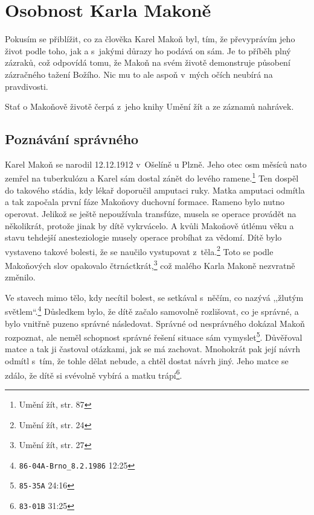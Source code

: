 \chapter{Osobnost Karla Makoně}


Pokusím se přiblížit, co za člověka Karel Makoň byl, tím, že převyprávím jeho
život podle toho, jak a s~jakými důrazy ho podává on sám. Je to příběh plný
zázraků, což odpovídá tomu, že Makoň na svém životě demonstruje působení
zázračného tažení Božího. Nic mu to ale aspoň v~mých očích neubírá na
pravdivosti.

Stať o Makoňově životě čerpá z~jeho knihy Umění žít\cite{KaMaUZ} a ze záznamů nahrávek.

\section{Poznávání správného}

Karel Makoň se narodil 12.12.1912 v~Ošelíně u Plzně. Jeho otec osm měsíců
nato zemřel na tuberkulózu a Karel sám dostal zánět do levého ramene.\footnote{Umění žít, str. 87} Ten dospěl
do takového stádia, kdy lékař doporučil amputaci ruky. Matka amputaci odmítla a tak
započala první fáze Makoňovy duchovní formace. Rameno bylo nutno operovat.
Jelikož se ještě nepoužívala transfúze, musela se operace provádět na
několikrát, protože jinak by dítě vykrvácelo. A kvůli Makoňově útlému věku a
stavu tehdejší anesteziologie musely operace probíhat za vědomí. Dítě bylo
vystaveno takové bolesti, že se naučilo vystupovat z~těla.\footnote{Umění žít,
str. 24} Toto se podle
Makoňových slov opakovalo čtrnáctkrát,\footnote{Umění žít, str. 27} což malého Karla Makoně nezvratně
změnilo.

Ve stavech mimo tělo, kdy necítil bolest, se setkával s~něčím, co nazývá
,,žlutým světlem``.\footnote{\texttt{86-04A-Brno\_8.2.1986} 12:25}  Důsledkem bylo, že dítě začalo samovolně rozlišovat, co je
  správné, a bylo vnitřně puzeno správné následovat. Správné od nesprávného dokázal
Makoň rozpoznat, ale neměl schopnost správné řešení situace sám
vymyslet\footnote{\texttt{85-35A} 24:16}. Důvěřoval
matce a tak ji častoval otázkami, jak se má zachovat. Mnohokrát pak její návrh
odmítl s~tím, že tohle dělat nebude, a chtěl dostat návrh jiný. Jeho
matce se zdálo, že dítě si svévolně vybírá a matku trápí\footnote{\texttt{83-01B}
31:25}.

